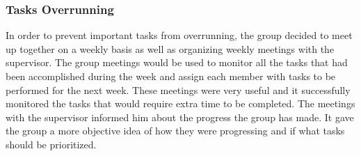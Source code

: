 \subsubsection{Tasks Overrunning}
In order to prevent important tasks from overrunning, the group decided to meet up together on a 
weekly basis as well as organizing weekly meetings with the supervisor. 
The group meetings would be used to monitor all the tasks that had been accomplished during the week and 
assign each member with tasks to be performed for the next week. 
These meetings were very useful and it successfully monitored the tasks that would require extra time to be completed. 
The meetings with the supervisor informed him about the progress the group has made. 
It gave the group a more objective idea of how they were progressing and if what tasks should be prioritized.

